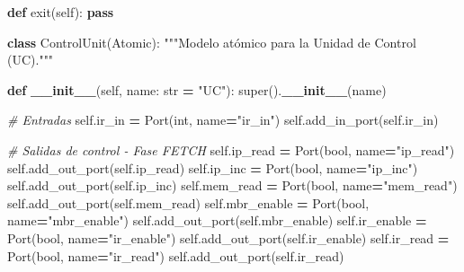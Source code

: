 \documentclass[12pt,oneside]{templates/unerthesis}
\newenvironment{Shaded}{\begin{snugshade}}{\end{snugshade}}
\newcommand{\BuiltInTok}[1]{#1}
\newcommand{\CommentTok}[1]{\textcolor[rgb]{0.56,0.35,0.01}{\textit{#1}}}
\newcommand{\ControlFlowTok}[1]{\textcolor[rgb]{0.13,0.29,0.53}{\textbf{#1}}}
\newcommand{\FunctionTok}[1]{\textcolor[rgb]{0.13,0.29,0.53}{\textbf{#1}}}
\newcommand{\KeywordTok}[1]{\textcolor[rgb]{0.13,0.29,0.53}{\textbf{#1}}}
\newcommand{\NormalTok}[1]{#1}
\newcommand{\OperatorTok}[1]{\textcolor[rgb]{0.81,0.36,0.00}{\textbf{#1}}}
\newcommand{\StringTok}[1]{\textcolor[rgb]{0.31,0.60,0.02}{#1}}
\newcommand{\VariableTok}[1]{\textcolor[rgb]{0.00,0.00,0.00}{#1}}
\begin{document}
\begin{Shaded}
\begin{Highlighting}[]
    \KeywordTok{def}\NormalTok{ exit(}\VariableTok{self}\NormalTok{):}
        \ControlFlowTok{pass}


\KeywordTok{class}\NormalTok{ ControlUnit(Atomic):}
    \StringTok{"""Modelo atómico para la Unidad de Control (UC)."""}
    
    \KeywordTok{def} \FunctionTok{\_\_init\_\_}\NormalTok{(}\VariableTok{self}\NormalTok{, name: }\BuiltInTok{str} \OperatorTok{=} \StringTok{"UC"}\NormalTok{):}
        \BuiltInTok{super}\NormalTok{().}\FunctionTok{\_\_init\_\_}\NormalTok{(name)}
        
        \CommentTok{\# Entradas}
        \VariableTok{self}\NormalTok{.ir\_in }\OperatorTok{=}\NormalTok{ Port(}\BuiltInTok{int}\NormalTok{, name}\OperatorTok{=}\StringTok{"ir\_in"}\NormalTok{)}
        \VariableTok{self}\NormalTok{.add\_in\_port(}\VariableTok{self}\NormalTok{.ir\_in)}
        
        \CommentTok{\# Salidas de control {-} Fase FETCH}
        \VariableTok{self}\NormalTok{.ip\_read }\OperatorTok{=}\NormalTok{ Port(}\BuiltInTok{bool}\NormalTok{, name}\OperatorTok{=}\StringTok{"ip\_read"}\NormalTok{)}
        \VariableTok{self}\NormalTok{.add\_out\_port(}\VariableTok{self}\NormalTok{.ip\_read)}
        \VariableTok{self}\NormalTok{.ip\_inc }\OperatorTok{=}\NormalTok{ Port(}\BuiltInTok{bool}\NormalTok{, name}\OperatorTok{=}\StringTok{"ip\_inc"}\NormalTok{)}
        \VariableTok{self}\NormalTok{.add\_out\_port(}\VariableTok{self}\NormalTok{.ip\_inc)}
        \VariableTok{self}\NormalTok{.mem\_read }\OperatorTok{=}\NormalTok{ Port(}\BuiltInTok{bool}\NormalTok{, name}\OperatorTok{=}\StringTok{"mem\_read"}\NormalTok{)}
        \VariableTok{self}\NormalTok{.add\_out\_port(}\VariableTok{self}\NormalTok{.mem\_read)}
        \VariableTok{self}\NormalTok{.mbr\_enable }\OperatorTok{=}\NormalTok{ Port(}\BuiltInTok{bool}\NormalTok{, name}\OperatorTok{=}\StringTok{"mbr\_enable"}\NormalTok{)}
        \VariableTok{self}\NormalTok{.add\_out\_port(}\VariableTok{self}\NormalTok{.mbr\_enable)}
        \VariableTok{self}\NormalTok{.ir\_enable }\OperatorTok{=}\NormalTok{ Port(}\BuiltInTok{bool}\NormalTok{, name}\OperatorTok{=}\StringTok{"ir\_enable"}\NormalTok{)}
        \VariableTok{self}\NormalTok{.add\_out\_port(}\VariableTok{self}\NormalTok{.ir\_enable)}
        \VariableTok{self}\NormalTok{.ir\_read }\OperatorTok{=}\NormalTok{ Port(}\BuiltInTok{bool}\NormalTok{, name}\OperatorTok{=}\StringTok{"ir\_read"}\NormalTok{)}
        \VariableTok{self}\NormalTok{.add\_out\_port(}\VariableTok{self}\NormalTok{.ir\_read)}
        

\end{Highlighting}
\end{Shaded}
\end{document}
